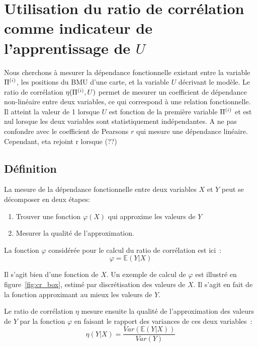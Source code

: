 \documentclass[../main]{subfiles}
\begin{document}
\section{Utilisation du ratio de corrélation comme indicateur de l'apprentissage de $U$}

Nous cherchons à mesurer la dépendance fonctionnelle existant entre la variable $\Pi^{({i})}$, les positions du BMU d'une carte, et la variable $U$ décrivant le modèle.
Le ratio de corrélation $\eta(\Pi^{({i})},U)$ permet de mesurer un coefficient de dépendance non-linéaire entre deux variables, ce qui correspond à une relation fonctionnelle. Il atteint la valeur de 1 lorsque $U$ est fonction de la première variable $\Pi^{({i})}$ et est nul lorsque les deux variables sont statistiquement indépendantes.
A ne pas confondre avec le coefficient de Pearsons $r$ qui mesure une dépendance linéaire. Cependant, eta rejoint r lorsque (??)

\subsection{Définition}

La mesure de la dépendance fonctionnelle entre deux variables $X$ et $Y$ peut se décomposer en deux étapes:
\begin{enumerate}
    \item Trouver une fonction $\varphi(X)$ qui approxime les valeurs de $Y$
    \item Mesurer la qualité de l'approximation.
\end{enumerate}

La fonction $\varphi$ considérée pour le calcul du ratio de corrélation est ici~:
\begin{equation}
    \varphi = \mathbb{E}(Y|X)
\end{equation}

Il s'agit bien d'une fonction de $X$. Un exemple de calcul de $\varphi$ est illustré en figure~\ref{fig:cr_box}, estimé par discrétisation des valeurs de $X$. Il s'agit en fait de la fonction approximant au mieux les valeurs de $Y$.

Le ratio de corrélation $\eta$ mesure ensuite la qualité de l'approximation des valeurs de $Y$ par la fonction $\varphi$ en faisant le rapport des variances de ces deux variables~:
\begin{equation}
    \eta(Y|X) = \frac{Var(\mathbb{E}(Y|X))}{Var(Y)}
\end{equation}
\end{document}
